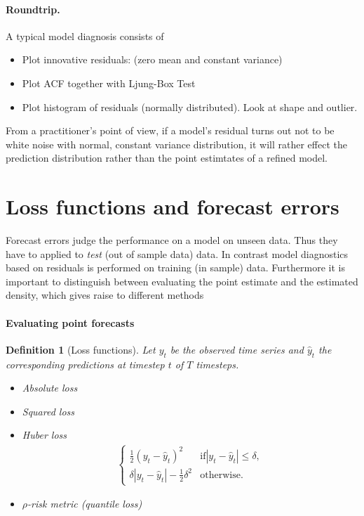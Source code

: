 \documentclass[12pt,a4paper]{article}
\newtheorem{definition}{Definition}
\begin{document}
\paragraph{Roundtrip.}A typical model diagnosis consists of
\begin{itemize}
	\item Plot innovative residuals: (zero mean and constant variance)
	\item Plot ACF together with Ljung-Box Test
	\item Plot histogram of residuals (normally distributed). Look at shape and outlier. 
\end{itemize}
From a practitioner's point of view, if a model's residual turns out not to be white noise with normal, constant variance distribution, it will rather effect the prediction distribution rather  than the point estimtates of a refined model. 

\section{Loss functions and forecast errors}
Forecast errors judge the performance on a model on unseen data. Thus they have to applied to \textit{test}  (out of sample data) data. In contrast model diagnostics based on residuals is performed on training (in sample) data. 
Furthermore it is important to distinguish between evaluating the point estimate and the estimated density, which gives raise to different methods

 \paragraph{Evaluating point forecasts}
\begin{definition}[Loss functions]
	Let $y_t$ be the observed time series and  $\hat y_t$ the corresponding predictions at timestep $t$  of $T$ timesteps.
	\begin{itemize}
		\item Absolute loss
		\item Squared loss
		\item Huber loss
		\begin{align} 
		\begin{cases}
		\frac{1}{2}(y_t-\hat y_t)^2 &  \text{if} \left | y_t - \hat y_t\right | \leq \delta, \\
		\delta \left | y_t - \hat y_t\right |  - \frac{1}{2} \delta^2& \text{otherwise.}
		\end{cases}	
		\end{align}
		\item $\rho$-risk metric (quantile loss) \cite{amazon_bayesian_2016}
	\end{itemize}
	
\end{definition}
\end{document}
